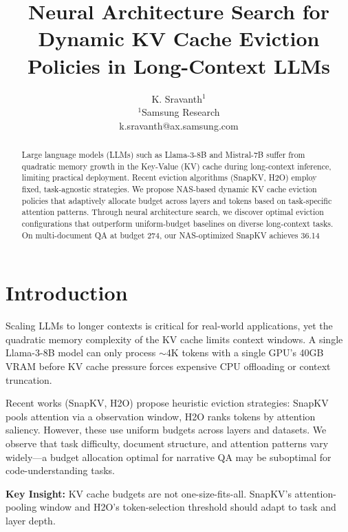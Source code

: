 \documentclass[11pt]{article}
\title{Neural Architecture Search for Dynamic KV Cache Eviction Policies in Long-Context LLMs}
\author{K. Sravanth$^{1}$\\
\affiliations
$^{1}$Samsung Research\\
\emails
k.sravanth@ax.samsung.com
}
\begin{document}
\maketitle

\begin{abstract}
Large language models (LLMs) such as Llama-3-8B and Mistral-7B suffer from quadratic memory growth in the Key-Value (KV) cache during long-context inference, limiting practical deployment. Recent eviction algorithms (SnapKV, H2O) employ fixed, task-agnostic strategies. We propose NAS-based dynamic KV cache eviction policies that adaptively allocate budget across layers and tokens based on task-specific attention patterns. Through neural architecture search, we discover optimal eviction configurations that outperform uniform-budget baselines on diverse long-context tasks. On multi-document QA at budget 274, our NAS-optimized SnapKV achieves 36.14%
\end{abstract}

\section{Introduction}

Scaling LLMs to longer contexts is critical for real-world applications, yet the quadratic memory complexity of the KV cache limits context windows. A single Llama-3-8B model can only process $\sim$4K tokens with a single GPU's 40GB VRAM before KV cache pressure forces expensive CPU offloading or context truncation.

Recent works (SnapKV, H2O) propose heuristic eviction strategies: SnapKV pools attention via a observation window, H2O ranks tokens by attention saliency. However, these use uniform budgets across layers and datasets. We observe that task difficulty, document structure, and attention patterns vary widely—a budget allocation optimal for narrative QA may be suboptimal for code-understanding tasks.

\textbf{Key Insight:} KV cache budgets are not one-size-fits-all. SnapKV's attention-pooling window and H2O's token-selection threshold should adapt to task and layer depth.
\end{document}
